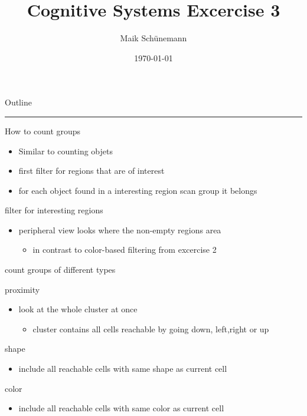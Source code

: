 \documentclass[presentation]{beamer}
\author{Maik Schünemann}
\date{\today}
\title{Cognitive Systems Excercise 3}
\begin{document}
\maketitle
\begin{frame}{Outline}
\tableofcontents
\end{frame}


\rule{\linewidth}{0.5pt}
\begin{frame}[label=sec-1]{How to count groups}
\begin{itemize}
\item Similar to counting objets
\item first filter for regions that are of interest
\item for each object found in a interesting region scan
group it belongs
\end{itemize}
\end{frame}
\begin{frame}[label=sec-2]{filter for interesting regions}
\begin{itemize}
\item peripheral view looks where the non-empty regions area
\begin{itemize}
\item in contrast to color-based filtering from excercise 2
\end{itemize}
\end{itemize}
\end{frame}
\begin{frame}[label=sec-3]{count groups of different types}
\begin{block}{proximity}
\begin{itemize}
\item look at the whole cluster at once 
\begin{itemize}
\item cluster contains all cells reachable by going down, left,right
or up
\end{itemize}
\end{itemize}
\end{block}
\begin{block}{shape}
\begin{itemize}
\item include all reachable cells with same shape as current cell
\end{itemize}
\end{block}
\begin{block}{color}
\begin{itemize}
\item include all reachable cells with same color as current cell
\end{itemize}
\end{block}
\end{frame}
\end{document}
